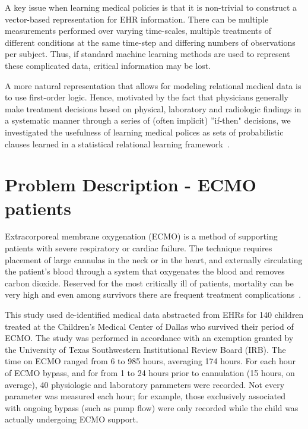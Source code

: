 \documentclass[letterpaper]{article}
\begin{document}
A key issue when learning medical policies is that it is non-trivial to construct a vector-based representation for EHR information. There can be multiple measurements performed over varying time-scales, multiple treatments of different conditions at the same time-step and differing numbers of observations per subject. Thus, if standard machine learning methods are used to represent these complicated data, critical information may be lost.

A more natural representation that allows for modeling relational medical data is to use first-order logic. Hence, motivated by the fact that physicians generally make treatment decisions based on physical, laboratory and radiologic findings in a systematic manner through a series of (often implicit) ''if-then" decisions, we investigated the usefulness of learning medical polices as sets of probabilistic clauses learned in a statistical relational learning framework~\cite{de2008probabilistic,raedt2016statistical}.%
\section{Problem Description - ECMO patients}
Extracorporeal membrane oxygenation (ECMO) is a method of supporting patients with severe respiratory or cardiac failure. The technique requires placement of large cannulas in the neck or in the heart, and externally circulating the patient's blood through a system that oxygenates the blood and removes carbon dioxide. Reserved for the most critically ill of patients, mortality can be very high and even among survivors there are frequent treatment complications~\cite{lin2017extracorporeal}.

This study used de-identified medical data abstracted from EHRs for 140 children treated at the Children's Medical Center of Dallas who survived their period of ECMO. The study was performed in accordance with an exemption granted by the University of Texas Southwestern Institutional Review Board (IRB). The time on ECMO ranged from 6 to 985 hours, averaging 174 hours. For each hour of ECMO bypass, and for from 1 to 24 hours prior to cannulation (15 hours, on average), 40 physiologic and laboratory parameters were recorded. Not every parameter was measured each hour; for example, those exclusively associated with ongoing bypass (such as pump flow) were only recorded while the child was actually undergoing ECMO support.
\end{document}
